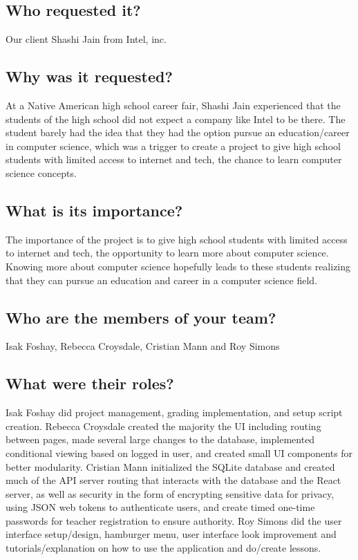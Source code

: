 \documentclass[draftclsnofoot,10pt,onecolumn]{IEEEtran}
\begin{document}
\subsection{Who requested it?} %
Our client Shashi Jain from Intel, inc.
\subsection{Why was it requested?}
At a Native American high school career fair, Shashi Jain experienced that the students of the high school did not expect a company like Intel to be there. The student barely had the idea that they had the option pursue an education/career in computer science, which was a trigger to create a project to give high school students with limited access to internet and tech, the chance to learn computer science concepts.
\subsection{What is its importance?}
The importance of the project is to give high school students with limited access to internet and tech, the opportunity to learn more about computer science. Knowing more about computer science hopefully leads to these students realizing that they can pursue an education and career in a computer science field.
\subsection{Who are the members of your team?}
Isak Foshay, Rebecca Croysdale, Cristian Mann and Roy Simons
\subsection{What were their roles?}
Isak Foshay did project management, grading implementation, and setup script creation.
Rebecca Croysdale created the majority the UI including routing between pages, made several large changes to the database, implemented conditional viewing based on logged in user, and created small UI components for better modularity.
Cristian Mann initialized the SQLite database and created much of the API server routing that interacts with the database and the React server, as well as security in the form of encrypting sensitive data for privacy, using JSON web tokens to authenticate users, and create timed one-time passwords for teacher registration to ensure authority.
Roy Simons did the user interface setup/design, hamburger menu, user interface look improvement and tutorials/explanation on how to use the application and do/create lessons.
\end{document}
